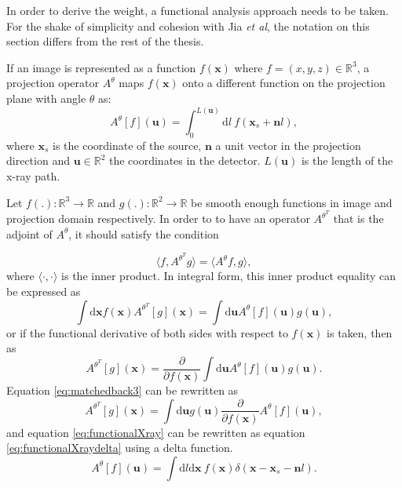 In order to derive the weight, a functional analysis approach needs to be taken. For the shake of simplicity and cohesion with Jia \textit{et al}, the notation on this section differs from the rest of the thesis. 

If an image is represented as a function $f(\textbf{x})$ where $f=(x,y,z)\in \mathbb{R}^3$, a projection operator $A^\theta$ maps $f(\textbf{x})$ onto a different function on the projection plane with angle $\theta$ as:
\begin{equation}
A^\theta[f](\textbf{u})=\int_0^{L(\textbf{u})}\mathrm{d}l \ f(\textbf{x}_s+\textbf{n}l),
\label{eq:functionalXray}
\end{equation}
where $\textbf{x}_s$ is the coordinate of the source, $\textbf{n}$ a unit vector in the projection direction and $\textbf{u}\in \mathbb{R}^2 $ the coordinates in the detector. $L(\textbf{u})$ is the length of the x-ray path. 

Let $f(.):\mathbb{R}^3 \rightarrow \mathbb{R}$ and $g(.):\mathbb{R}^2 \rightarrow \mathbb{R}$ be smooth enough functions in image and  projection domain respectively. In order to to have an operator $A^{\theta^T}$ that is the adjoint of $A^\theta$, it should satisfy the condition 

\begin{equation}
\langle f, A^{\theta^T} g\rangle = \langle A^\theta f,g \rangle,
\end{equation}
where $\langle \cdot, \cdot\rangle $ is the inner product. In integral form, this inner product equality can be expressed as
\begin{equation}
\int \mathrm{d}\textbf{x}f(\textbf{x})A^{\theta^T} [g](\textbf{x})=\int \mathrm{d}\textbf{u}A^{\theta} [f](\textbf{u}) g(\textbf{u}),
\end{equation}
or if the functional derivative of both sides with respect to $f(\textbf{x})$ is taken, then as
\begin{equation}
A^{\theta^T} [g](\textbf{x})=\frac{\partial}{\partial f(\textbf{x})}\int \mathrm{d}\textbf{u}A^{\theta} [f](\textbf{u}) g(\textbf{u}).
\label{eq:matchedback3}
\end{equation}
Equation \ref{eq:matchedback3} can be rewritten as
\begin{equation}
A^{\theta^T} [g](\textbf{x})=\int \mathrm{d}\textbf{u}g(\textbf{u})\frac{\partial}{\partial f(\textbf{x})}A^{\theta} [f](\textbf{u}),
\label{eq:matchedback4}
\end{equation}
and equation \ref{eq:functionalXray} can be rewritten as equation \ref{eq:functionalXraydelta} using a delta function.
\begin{equation}
A^\theta[f](\textbf{u})=\int\mathrm{d}l\mathrm{d}\textbf{x} \ f(\textbf{x})\delta(\textbf{x}-\textbf{x}_s-\textbf{n}l).
\label{eq:functionalXraydelta}
\end{equation}

